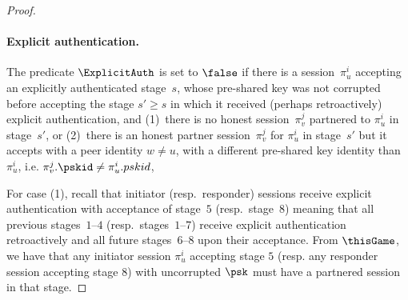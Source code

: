 \begin{proof}
	\paragraph{Explicit authentication.}
	The predicate $\ExplicitAuth$ is set to $\false$ if there is a session~$\pi_u^i$ accepting an explicitly authenticated stage~$s$, whose pre-shared key was not corrupted before accepting the stage $s' \geq s$ in which it received (perhaps retroactively) explicit authentication, and (1)~there is no honest session~$\pi_v^j$ partnered to $\pi_u^i$ in stage~$s'$, or (2)~there is an honest partner session~$\pi_v^j$ for $\pi_u^i$ in stage~$s'$ but it accepts with a peer identity $w \neq u$, with a different pre-shared key identity than $\pi_u^i$, i.e. $\pi_v^j.\pskid \neq \pi_u^i.pskid$, 
	
	For case (1), recall that initiator (resp.\ responder) sessions receive explicit authentication with acceptance of stage~$5$ (resp.\ stage~$8$) meaning that all previous stages~$1$--$4$ (resp.\ stages~$1$--$7$) receive explicit authentication retroactively and all future stages~$6$--$8$ upon their acceptance.
	{From $\thisGame$, we have that any initiator session $\pi_u^i$ accepting stage $5$ (resp. any responder session accepting stage $8$)  with uncorrupted $\psk$ must have a partnered session in that stage.}
	

\end{proof}
